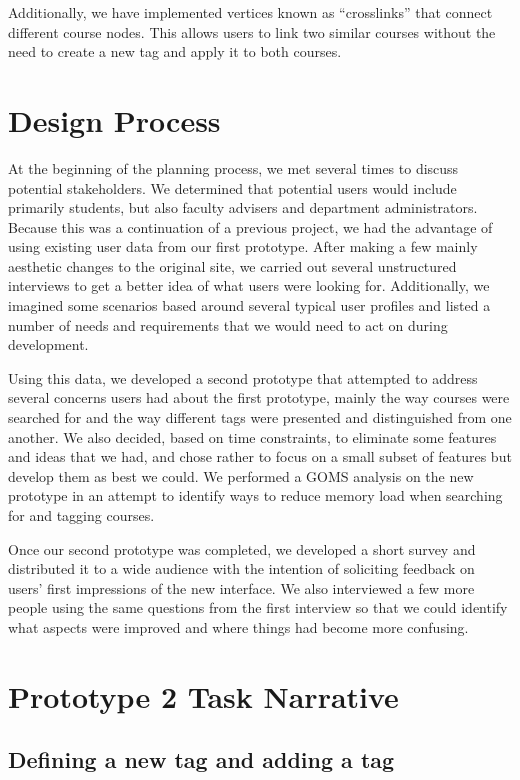 \documentclass[12pt]{report}
\begin{document}
Additionally, we have implemented vertices known as ``crosslinks'' that connect different course nodes. This allows users to link two similar courses without the need to create a new tag and apply it to both courses.


\chapter{Design Process}

At the beginning of the planning process, we met several times to discuss potential stakeholders. We determined that potential users would include primarily students, but also faculty advisers and department administrators. Because this was a continuation of a previous project, we had the advantage of using existing user data from our first prototype. After making a few mainly aesthetic changes to the original site, we carried out several unstructured interviews to get a better idea of what users were looking for. Additionally, we imagined some scenarios based around several typical user profiles and listed a number of needs and requirements that we would need to act on during development.

Using this data, we developed a second prototype that attempted to address several concerns users had about the first prototype, mainly the way courses were searched for and the way different tags were presented and distinguished from one another. We also decided, based on time constraints, to eliminate some features and ideas that we had, and chose rather to focus on a small subset of features but develop them as best we could. We performed a GOMS analysis on the new prototype in an attempt to identify ways to reduce memory load when searching for and tagging courses.

Once our second prototype was completed, we developed a short survey and distributed it to a wide audience with the intention of soliciting feedback on users' first impressions of the new interface. We also interviewed a few more people using the same questions from the first interview so that we could identify what aspects were improved and where things had become more confusing.


\chapter{Prototype 2 Task Narrative}

\section{Defining a new tag and adding a tag}
\end{document}
